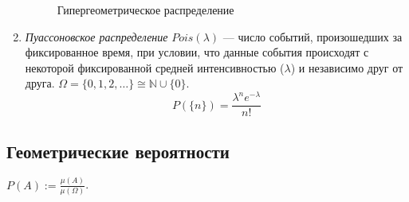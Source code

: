 \begin{enumerate}
\begin{figure}[h!]
				\caption{Гипергеометрическое распределение}
				\label{lect02:pic1}
			\end{figure}
            \item \emph{Пуассоновское распределение} $Pois(\lambda)$ --- число событий, произошедших за фиксированное время, при условии, что данные события происходят с некоторой фиксированной средней интенсивностью ($\lambda$) и независимо друг от друга. $\Omega = \{0, 1, 2, \dots \} \cong \mathbb{N} \cup \{0\}$.\\
            \begin{equation*}
                P\left(\{n\}\right) = \frac{\lambda^ne^{-\lambda}}{n!}
            \end{equation*}
        \end{enumerate}
    \subsection{Геометрические вероятности} 
        $P(A) := \frac{\mu(A)}{\mu(\Omega)}$.

